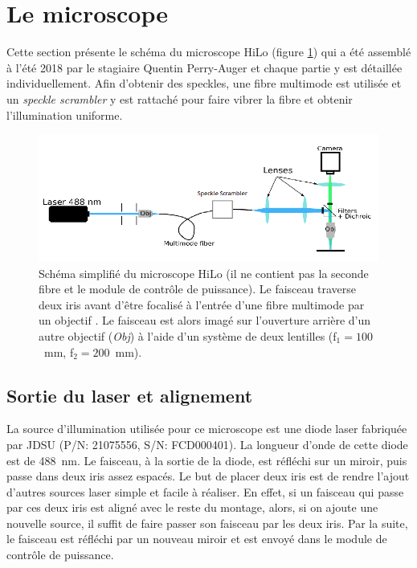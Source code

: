 \documentclass{article}       %
\begin{document}
\section{Le microscope}

Cette section présente le schéma du microscope HiLo (figure \ref{Fig:Microscope}) qui a été assemblé à l'été 2018 par le stagiaire Quentin Perry-Auger  et chaque partie y est détaillée individuellement. Afin d'obtenir des speckles, une fibre multimode est utilisée et un
\textit{speckle scrambler} y est rattaché pour faire vibrer la fibre et obtenir l'illumination uniforme.

\begin{figure}[H]
    \centering
    \includegraphics[scale=0.65]{fig/Microtempo.png}
    \caption{Schéma simplifié du microscope HiLo (il ne contient pas la seconde fibre et le module de contrôle de puissance). Le faisceau traverse deux iris avant d'être focalisé à l'entrée d'une fibre multimode par un objectif . Le faisceau est alors imagé sur l'ouverture arrière d'un autre objectif (\textit{Obj}) à l'aide d'un système de deux lentilles (f$_{1} = 100$~mm, f$_{2} = 200$~mm).}
    \label{Fig:Microscope}
\end{figure}

\subsection{Sortie du laser et alignement}

La source d'illumination utilisée pour ce microscope est une diode laser fabriquée par JDSU (P/N: 21075556, S/N: FCD000401). La longueur d'onde de cette diode est de 488~nm. Le faisceau, à la sortie de la diode, est réfléchi sur un miroir, puis passe dans deux iris assez espacés. Le but de placer deux iris est de rendre l'ajout d'autres sources laser simple et facile à réaliser. En effet, si un faisceau qui passe par ces deux iris est aligné avec le reste du montage, alors, si on ajoute une nouvelle source, il suffit de faire passer son faisceau par les deux iris. Par la suite, le faisceau est réfléchi par un nouveau miroir et est envoyé dans le module de contrôle de puissance.
\end{document}
